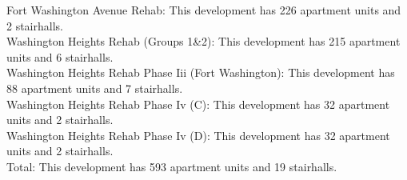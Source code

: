 {Fort Washington Avenue Rehab}: This development has 226 apartment units and 2 stairhalls.\\{Washington Heights Rehab (Groups 1&2)}: This development has 215 apartment units and 6 stairhalls.\\{Washington Heights Rehab Phase Iii (Fort Washington)}: This development has 88 apartment units and 7 stairhalls.\\{Washington Heights Rehab Phase Iv (C)}: This development has 32 apartment units and 2 stairhalls.\\{Washington Heights Rehab Phase Iv (D)}: This development has 32 apartment units and 2 stairhalls.\\{Total}: This development has 593 apartment units and 19 stairhalls.\\